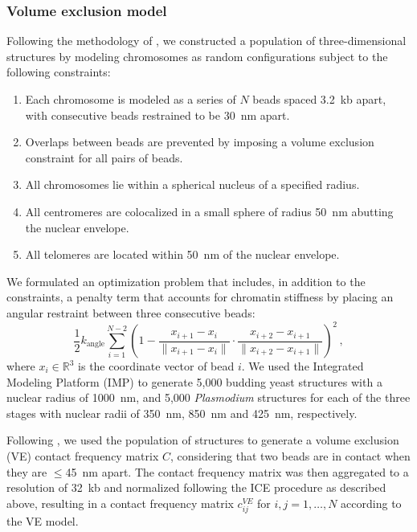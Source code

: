 \subsubsection*{Volume exclusion model}
\label{met:volume-exclusion}

Following the methodology of \cite{tjong:physical}, we
constructed a population of three-dimensional structures by modeling
chromosomes as random configurations subject to the following
constraints:
\begin{enumerate}
\item Each chromosome is modeled as a series of $N$ beads spaced 3.2~kb apart,
  with consecutive beads restrained to be 30~nm apart.
\item Overlaps between beads are prevented by imposing a volume
  exclusion constraint for all pairs of beads.
\item All chromosomes lie within a spherical nucleus of a specified
  radius.
\item All centromeres are colocalized in a small sphere of radius
  50~nm abutting the nuclear envelope.
\item All telomeres are located within 50~nm of the nuclear envelope.
\end{enumerate}
We formulated an optimization problem that includes, in addition to the
constraints, a penalty term that accounts for chromatin stiffness by
placing an angular restraint between three consecutive beads:
\begin{equation}
\frac{1}{2} k_{\text{angle}} \sum^{N - 2}_{i = 1} \left( 1 - \frac{x_{i + 1} -
x_i}{\|x_{i + 1} - x_i\|} \cdot \frac{x_{i + 2} - x_{i + 1}}{\|x_{i + 2} -
  x_{i + 1}\|} \right)^2\,,
\end{equation}
where $x_i \in \mathbb{R}^3$ is the coordinate vector of bead $i$.
We used the Integrated Modeling Platform (IMP) \citep{bau:three-dimensional}
to generate 5,000 budding yeast structures with a nuclear radius of
1000~nm, and 5,000 {\em Plasmodium} structures for each of the three
stages with nuclear radii of 350~nm, 850~nm and 425~nm, respectively.

Following \cite{tjong:physical}, we used the population of structures to
generate a volume exclusion (VE) contact frequency matrix $C$,
considering that two beads are in contact when they are $\leq$45~nm apart.
The contact frequency matrix was then aggregated to a resolution of
32~kb and normalized following the ICE procedure as described above,
resulting in a contact frequency matrix
$c_{ij}^{VE}$ for $i,j=1,\ldots,N$ according to the VE model.

